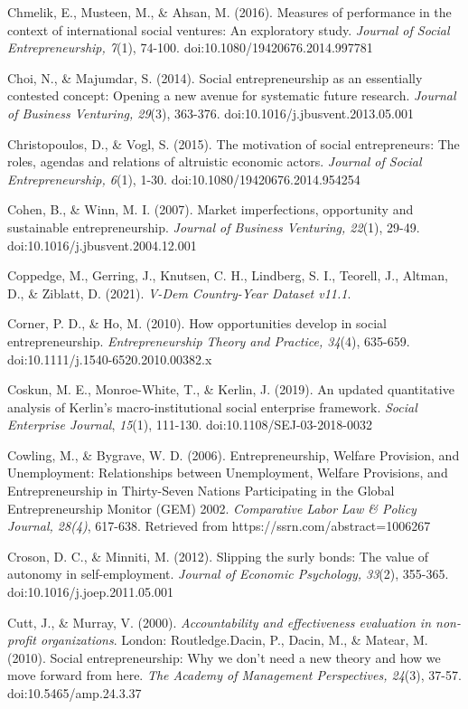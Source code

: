 \documentclass{article}
\begin{document}
Chmelik, E., Musteen, M., \& Ahsan, M. (2016). Measures of performance in the context of international social ventures: An exploratory study. \emph{Journal of Social Entrepreneurship, 7}(1), 74-100. doi:10.1080/19420676.2014.997781

Choi, N., \& Majumdar, S. (2014). Social entrepreneurship as an essentially contested concept: Opening a new avenue for systematic future research. \emph{Journal of Business Venturing, 29}(3), 363-376. doi:10.1016/j.jbusvent.2013.05.001

Christopoulos, D., \& Vogl, S. (2015). The motivation of social entrepreneurs: The roles, agendas and relations of altruistic economic actors. \emph{Journal of Social Entrepreneurship, 6}(1), 1-30. doi:10.1080/19420676.2014.954254

Cohen, B., \& Winn, M. I. (2007). Market imperfections, opportunity and sustainable entrepreneurship. \emph{Journal of Business Venturing, 22}(1), 29-49. doi:10.1016/j.jbusvent.2004.12.001

Coppedge, M., Gerring, J., Knutsen, C. H., Lindberg, S. I., Teorell, J., Altman, D., \& Ziblatt, D. (2021). \emph{V-Dem Country-Year Dataset v11.1}. 

Corner, P. D., \& Ho, M. (2010). How opportunities develop in social entrepreneurship. \emph{Entrepreneurship Theory and Practice, 34}(4), 635-659. doi:10.1111/j.1540-6520.2010.00382.x

Coskun, M. E., Monroe-White, T., \& Kerlin, J. (2019). An updated quantitative analysis of Kerlin's macro-institutional social enterprise framework. \emph{Social Enterprise Journal}, \emph{15}(1), 111-130. doi:10.1108/SEJ-03-2018-0032

Cowling, M., \& Bygrave, W. D. (2006). Entrepreneurship, Welfare Provision, and Unemployment: Relationships between Unemployment, Welfare Provisions, and Entrepreneurship in Thirty-Seven Nations Participating in the Global Entrepreneurship Monitor (GEM) 2002. \emph{Comparative }\emph{Labor}\emph{ Law \& Policy Journal, 28(4)}, 617-638. Retrieved from https://ssrn.com/abstract=1006267

Croson, D. C., \& Minniti, M. (2012). Slipping the surly bonds: The value of autonomy in self-employment. \emph{Journal of Economic Psychology, 33}(2), 355-365. doi:10.1016/j.joep.2011.05.001

Cutt, J., \& Murray, V. (2000). \emph{Accountability and effectiveness evaluation in non-profit organizations}. London: Routledge.Dacin, P., Dacin, M., \& Matear, M. (2010). Social entrepreneurship: Why we don't need a new theory and how we move forward from here. \emph{The Academy of Management Perspectives, 24}(3), 37-57. doi:10.5465/amp.24.3.37
\end{document}

